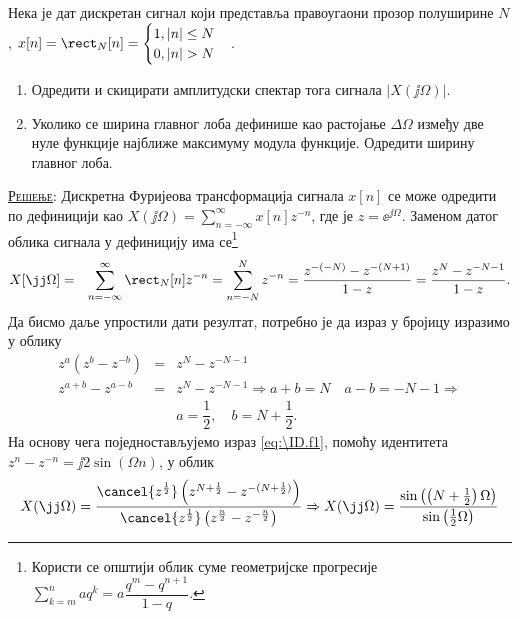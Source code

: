 \PID \label{z:dtft_rec}
Нека је дат дискретан сигнал који представља правоугаони прозор полуширине $N$,  
$x[n] = \rect_N[n] = \begin{cases}
    1, |n| \leq N \\
    0, |n| > N
\end{cases}$. 
\begin{enumerate}[label=(\alph*)]
    \item Одредити и скицирати амплитудски спектар тога сигнала $|X(\jj\Omega)|$.
    \item Уколико се ширина главног лоба дефинише као растојање $\Delta \Omega$ између две нуле функције најближе 
    максимуму модула функције. Одредити ширину главног лоба. 
\end{enumerate}

\textsc{\underline{Решење}:}
Дискретна Фуријеова трансформација сигнала $x[n]$ се може одредити по дефиницији као 
$X(\jj\Omega) = \sum_{n = -\infty}^{\infty} x[n] z^{-n}$, где је $z = \ee^{\jj\Omega}$. Заменом датог облика сигнала 
у дефиницију има се\footnote{Користи се општији облик суме геометријске прогресије
    $\sum_{k = m}^n a q^k = a\dfrac{q^m - q^{n+1}}{1-q}$.
}
\begin{eqnarray}
    X[\jj\Omega] &=& \sum_{n = -\infty}^{\infty} \rect_N[n] z^{-n} = \sum_{n = -N}^N z^{-n} 
    = \dfrac{ z^{-(-N)} - z^{-(N+1)} }{1 - z} = 
    \dfrac{z^{N} - z^{-N-1}}{1 - z}. \label{eq:\ID.f1}
\end{eqnarray}
Да бисмо даље упростили дати резултат, потребно је да израз у бројицу изразимо у облику
\begin{eqnarray}
    z^a(z^b - z^{-b}) &=& z^{N} - z^{-N-1}  \\[2mm]
    z^{a+b} - z^{a-b} &=& z^{N} - z^{-N-1} \Rightarrow
    a+b = N\quad a-b = -N-1  
    \Rightarrow \\
    && a = \dfrac{1}{2}, \quad b = N + \dfrac{1}{2}.
\end{eqnarray}
На основу чега поједностављујемо израз \ref{eq:\ID.f1}, помоћу идентитета 
$z^n - z^{-n} = \jj 2 \sin(\Omega n)$, у облик 
\begin{equation}
    X(\jj\Omega) = \dfrac{ \cancel{z^{\frac12}}\left( z^{N + \frac12} - z^{-(N + \frac12)} \right)  }
    { \cancel{z^{\frac12}} \left( z^{\frac n2} - z^{-\frac n2} \right)}
    \Rightarrow
    X(\jj\Omega) 
    = \dfrac{\sin \left( \left(N + \frac12\right) \Omega \right) }{ \sin \left(  \frac12 \Omega \right)}
    \label{\ID:eq_rez}
\end{equation}

